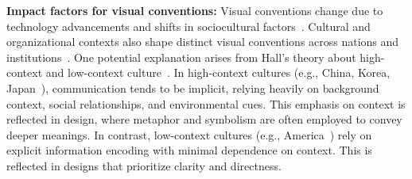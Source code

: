 \textbf{Impact factors for visual conventions:}
Visual conventions change due to technology advancements and shifts in sociocultural factors~\cite{Kostelnick2003Shaping}.
Cultural and organizational contexts also shape distinct visual conventions across nations and institutions~\cite{Kostelnick2003Shaping}. 
One potential explanation arises from Hall's theory about high-context and low-context culture~\cite{Hall1977Culture}. 
In high-context cultures (e.g., China, Korea, Japan~\cite{Kim1998High}), communication tends to be implicit, relying heavily on background context, social relationships, and environmental cues. 
This emphasis on context is reflected in design, where metaphor and symbolism are often employed to convey deeper meanings. 
In contrast, low-context cultures (e.g., America~\cite{Kim1998High}) rely on explicit information encoding with minimal dependence on context. 
This is reflected in designs that prioritize clarity and directness.


